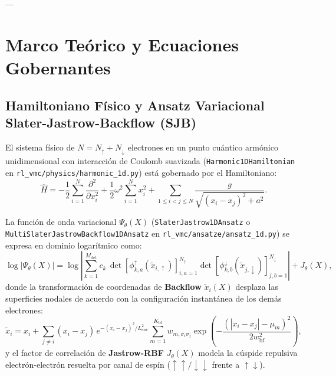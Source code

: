\documentclass[10pt,a4paper]{article}
\begin{document}
---

\section{Marco Te\'orico y Ecuaciones Gobernantes}

\subsection{Hamiltoniano F\'isico y Ansatz Variacional Slater-Jastrow-Backflow (SJB)}

El sistema f\'isico de $N = N_\uparrow + N_\downarrow$ electrones en un punto cu\'antico arm\'onico unidimensional con interacci\'on de Coulomb suavizada (\texttt{Harmonic1DHamiltonian} en \texttt{rl\_vmc/physics/harmonic\_1d.py}) est\'a gobernado por el Hamiltoniano:
\begin{equation}
\hat{H} = -\frac{1}{2}\sum_{i=1}^{N} \frac{\partial^2}{\partial x_i^2} + \frac{1}{2}\omega^2 \sum_{i=1}^{N} x_i^2 + \sum_{1 \le i < j \le N} \frac{g}{\sqrt{(x_i - x_j)^2 + a^2}}.
\label{eq:hamiltonian}
\end{equation}

La funci\'on de onda variacional $\Psi_\theta(X)$ (\texttt{SlaterJastrow1DAnsatz} o \texttt{MultiSlaterJastrowBackflow1DAnsatz} en \texttt{rl\_vmc/ansatze/ansatz\_1d.py}) se expresa en dominio logar\'itmico como:
\begin{equation}
\log |\Psi_\theta(X)| = \log \left| \sum_{k=1}^{M_{\mathrm{det}}} c_k \, \det\!\left[\phi_{k,a}^\uparrow(\tilde{x}_{i,\uparrow})\right]_{i,a=1}^{N_\uparrow} \det\!\left[\phi_{k,b}^\downarrow(\tilde{x}_{j,\downarrow})\right]_{j,b=1}^{N_\downarrow} \right| + J_\theta(X),
\label{eq:ansatz_sjb}
\end{equation}
donde la transformaci\'on de coordenadas de \textbf{Backflow} $\tilde{x}_i(X)$ desplaza las superficies nodales de acuerdo con la configuraci\'on instant\'anea de los dem\'as electrones:
\begin{equation}
\tilde{x}_i = x_i + \sum_{j \ne i} (x_i - x_j)\, e^{-(x_i - x_j)^2 / L_{\mathrm{env}}^2} \sum_{m=1}^{K_{\mathrm{bf}}} w_{m,\sigma_i\sigma_j} \exp\!\left(-\frac{(|x_i - x_j| - \mu_m)^2}{2w_{\mathrm{bf}}^2}\right),
\end{equation}
y el factor de correlaci\'on de \textbf{Jastrow-RBF} $J_\theta(X)$ modela la c\'uspide repulsiva electr\'on-electr\'on resuelta por canal de esp\'in ($\uparrow\uparrow / \downarrow\downarrow$ frente a $\uparrow\downarrow$).
\end{document}
